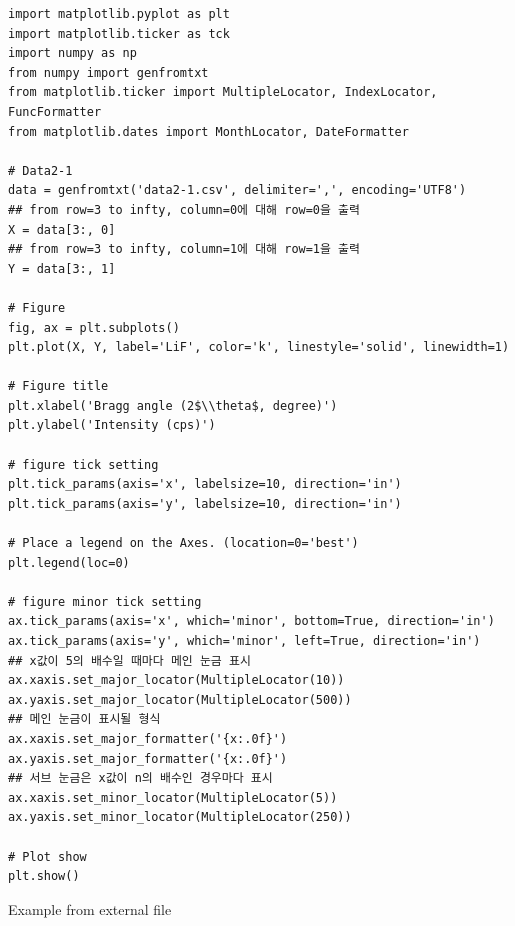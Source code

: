 \documentclass[a4paper, 10pt, nanum]{CSUniSchoolLabReport}
\begin{document}
\begin{listing}[ht!]
	\begin{verbatim}
import matplotlib.pyplot as plt
import matplotlib.ticker as tck
import numpy as np
from numpy import genfromtxt
from matplotlib.ticker import MultipleLocator, IndexLocator, FuncFormatter
from matplotlib.dates import MonthLocator, DateFormatter

# Data2-1
data = genfromtxt('data2-1.csv', delimiter=',', encoding='UTF8')
## from row=3 to infty, column=0에 대해 row=0을 출력
X = data[3:, 0]
## from row=3 to infty, column=1에 대해 row=1을 출력
Y = data[3:, 1]

# Figure
fig, ax = plt.subplots()
plt.plot(X, Y, label='LiF', color='k', linestyle='solid', linewidth=1)

# Figure title
plt.xlabel('Bragg angle (2$\\theta$, degree)')
plt.ylabel('Intensity (cps)')

# figure tick setting
plt.tick_params(axis='x', labelsize=10, direction='in')
plt.tick_params(axis='y', labelsize=10, direction='in')

# Place a legend on the Axes. (location=0='best')
plt.legend(loc=0)

# figure minor tick setting
ax.tick_params(axis='x', which='minor', bottom=True, direction='in')
ax.tick_params(axis='y', which='minor', left=True, direction='in')
## x값이 5의 배수일 때마다 메인 눈금 표시
ax.xaxis.set_major_locator(MultipleLocator(10)) 
ax.yaxis.set_major_locator(MultipleLocator(500))
## 메인 눈금이 표시될 형식
ax.xaxis.set_major_formatter('{x:.0f}')
ax.yaxis.set_major_formatter('{x:.0f}')
## 서브 눈금은 x값이 n의 배수인 경우마다 표시
ax.xaxis.set_minor_locator(MultipleLocator(5)) 
ax.yaxis.set_minor_locator(MultipleLocator(250))

# Plot show
plt.show()
	\end{verbatim}
	\caption{Example from external file}
	\label{listing:graph2-code}
\end{listing}
\end{document}
